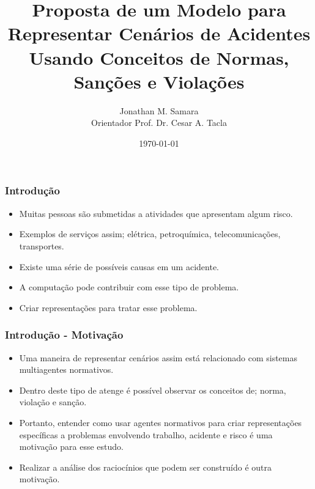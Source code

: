 \documentclass{beamer}
\title{Proposta de um Modelo para Representar Cenários de Acidentes Usando Conceitos de Normas, Sanções e Violações} %
\author{Jonathan M. Samara \\ Orientador Prof. Dr. Cesar A. Tacla} %
\institute[UTFPR] %
{
Universidade Tecnológica Federal do Paraná \\ %
\medskip
}
\date{\today} %
\begin{document}
\begin{frame}
\titlepage %
\end{frame}

\begin{frame}
\frametitle{Introdução} %
	\begin{itemize}
			\item Muitas pessoas são submetidas a atividades que apresentam algum risco. 
			\item Exemplos de serviços assim; elétrica, petroquímica, telecomunicações, transportes. 
			\item Existe uma série de possíveis causas em um acidente. 
			\item A computação pode contribuir com esse tipo de problema. 
			\item Criar representações para tratar esse problema. 			
	\end{itemize}
\end{frame}

\begin{frame}
\frametitle{Introdução - Motivação} %
	\begin{itemize}
			\item Uma maneira de representar cenários assim está relacionado com sistemas multiagentes normativos. 
			\item Dentro deste tipo de atenge é possível observar os conceitos de; norma, violação e sanção.
			\item Portanto, entender como usar agentes normativos para criar representações específicas a problemas envolvendo trabalho, acidente e risco é uma motivação para esse estudo. 
			\item Realizar a análise dos raciocínios que podem ser construído é outra motivação. 			
	\end{itemize}
\end{frame}
\end{document}
